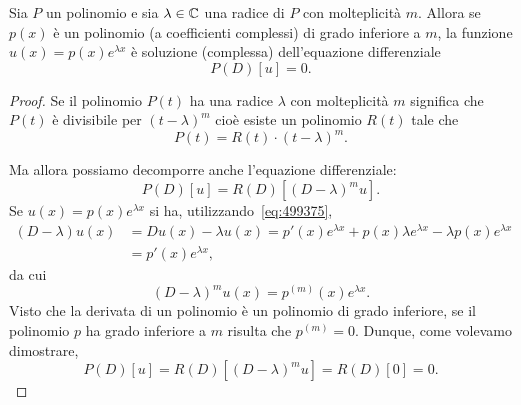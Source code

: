 \begin{theorem}
\mymark{***}
Sia $P$ un polinomio e sia $\lambda\in \mathbb C$ una radice di $P$ con molteplicità $m$.
Allora se $p(x)$ è un polinomio (a coefficienti complessi) di grado inferiore a $m$,
la funzione $u(x) = p(x) e^{\lambda x}$ è soluzione (complessa) dell'equazione differenziale
\[
   P(D) [u] = 0.
\]
\end{theorem}
%
\begin{proof}
\mymark{***}
Se il polinomio $P(t)$ ha una radice $\lambda$ con molteplicità $m$ significa che $P(t)$ è divisibile per $(t-\lambda)^m$ cioè esiste un polinomio $R(t)$ tale che
\[
  P(t) = R(t)\cdot (t-\lambda)^m.
\]

Ma allora possiamo decomporre anche l'equazione differenziale:
\[
 P(D) [u] = R(D)[(D - \lambda)^m u].
\]
Se $u(x) = p(x) e^{\lambda x}$ si ha,
utilizzando~\eqref{eq:499375},
\begin{align*}
  (D-\lambda) u(x) &= Du(x) -\lambda u(x) =
  p'(x) e^{\lambda x} + p(x) \lambda e^{\lambda x} - \lambda p(x) e^{\lambda x} \\
  &= p'(x) e^{\lambda x},
\end{align*}
da cui
\[
  (D-\lambda)^m u(x) = p^{(m)}(x) e^{\lambda x}.
\]
Visto che la derivata di un polinomio è un polinomio di grado inferiore,
se il polinomio $p$ ha grado inferiore a $m$ risulta che $p^{(m)}=0$.
Dunque, come volevamo dimostrare,
\[
 P(D) [u] = R(D) [(D-\lambda)^m u] = R(D) [0] = 0.
\]
\end{proof}


